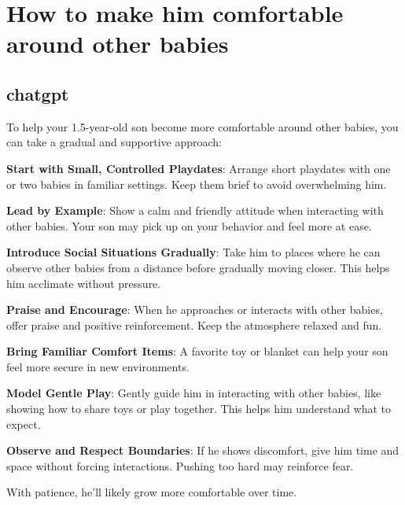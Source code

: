 \documentclass{paper}
\begin{document}
\section{How to make him comfortable around other babies}
\subsection{chatgpt}

To help your 1.5-year-old son become more comfortable around other babies, you can take a gradual and supportive approach:

\textbf{Start with Small, Controlled Playdates}: Arrange short playdates with one or two babies in familiar settings. Keep them brief to avoid overwhelming him.

\textbf{Lead by Example}: Show a calm and friendly attitude when interacting with other babies. Your son may pick up on your behavior and feel more at ease.

\textbf{Introduce Social Situations Gradually}: Take him to places where he can observe other babies from a distance before gradually moving closer. This helps him acclimate without pressure.

\textbf{Praise and Encourage}: When he approaches or interacts with other babies, offer praise and positive reinforcement. Keep the atmosphere relaxed and fun.

\textbf{Bring Familiar Comfort Items}: A favorite toy or blanket can help your son feel more secure in new environments.

\textbf{Model Gentle Play}: Gently guide him in interacting with other babies, like showing how to share toys or play together. This helps him understand what to expect.

\textbf{Observe and Respect Boundaries}: If he shows discomfort, give him time and space without forcing interactions. Pushing too hard may reinforce fear.

With patience, he’ll likely grow more comfortable over time.
\end{document}
